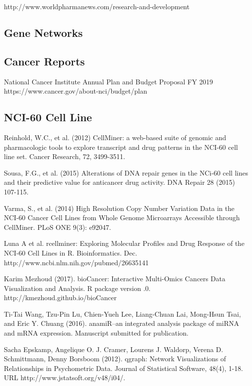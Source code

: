  http://www.worldpharmanews.com/research-and-development

\subsection{Gene Networks}
	

\subsection{Cancer Reports}
	
 National Cancer Institute
\newblock Annual Plan and Budget Proposal FY 2019
\newblock https://www.cancer.gov/about-nci/budget/plan 


\subsection{NCI-60 Cell Line}

Reinhold, W.C., et al. (2012) 
\newblock CellMiner: a web-based suite of genomic and pharmacologic tools to explore transcript and drug patterns in the NCI-60 cell line set. 
\newblock Cancer Research, 72, 3499-3511.

Sousa, F.G., et al. (2015) 
\newblock Alterations of DNA repair genes in the NCi-60 cell lines and their predictive value for anticancer drug activity. 
\newblock DNA Repair 28 (2015) 107-115.

Varma, S., et al. (2014) 
\newblock High Resolution Copy Number Variation Data in the NCI-60 Cancer Cell Lines from Whole Genome Microarrays Accessible through CellMiner. 
\newblock PLoS ONE 9(3): e92047.

 Luna A et al. rcellminer: Exploring Molecular Profiles and
\newblock Drug Response of the NCI-60 Cell Lines in R. Bioinformatics.
 Dec. http://www.ncbi.nlm.nih.gov/pubmed/26635141

Karim Mezhoud (2017). bioCancer: Interactive Multi-Omics
\newblock Cancers Data Visualization and Analysis. R package version
.0. http://kmezhoud.github.io/bioCancer

Ti-Tai Wang, Tzu-Pin Lu, Chien-Yueh Lee, Liang-Chuan Lai, Mong-Hsun Tsai, and Eric Y. Chuang (2016). 
\newblock anamiR--an integrated analysis package of miRNA and mRNA expression.
\newblock Manuscript submitted for publication.

Sacha Epskamp, Angelique O. J. Cramer, Lourens J. Waldorp, Verena D. Schmittmann, Denny Borsboom (2012). 
\newblock qgraph: Network Visualizations of Relationships in Psychometric Data. 
\newblock Journal of Statistical Software, 48(4), 1-18. URL http://www.jstatsoft.org/v48/i04/.



